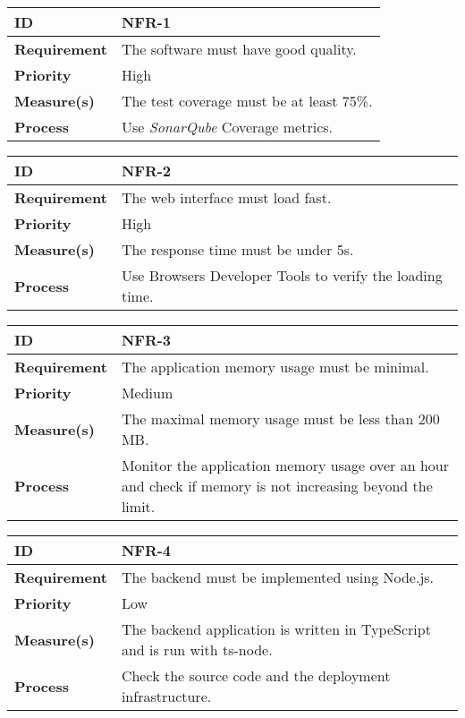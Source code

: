 \begin{center}
\begin{tabular}{ | m{8em} | m{25em}| } 
 \hline
 \textbf{ID} & NFR-1\\ 
 \hline
 \textbf{Requirement} & The software must have good quality. \\
 \hline
 \textbf{Priority} & High\\
 \hline
 \textbf{Measure(s)} & The test coverage must be at least 75\%.\\
 \hline
 \textbf{Process} & Use \textit{SonarQube} Coverage metrics. \\
 \hline
\end{tabular}
\end{center}

\begin{center}
\begin{tabular}{ | m{8em} | m{25em}| } 
 \hline
 \textbf{ID} & NFR-2\\ 
 \hline
 \textbf{Requirement} & The web interface must load fast.\\
 \hline
 \textbf{Priority} & High\\
 \hline
 \textbf{Measure(s)} & The response time must be under 5s.\\
 \hline
 \textbf{Process} & Use Browsers Developer Tools to verify the loading time.\\
 \hline
\end{tabular}
\end{center}

\begin{center}
\begin{tabular}{ | m{8em} | m{25em}| } 
 \hline
 \textbf{ID} & NFR-3\\ 
 \hline
 \textbf{Requirement} & The application memory usage must be minimal.\\
 \hline
 \textbf{Priority} & Medium\\
 \hline
 \textbf{Measure(s)} & The maximal memory usage must be less than 200 MB.\\
 \hline
 \textbf{Process} & Monitor the application memory usage over an hour and check if memory is not increasing beyond the limit.\\
 \hline
\end{tabular}
\end{center}

\begin{center}
\begin{tabular}{ | m{8em} | m{25em}| } 
 \hline
 \textbf{ID} & NFR-4\\ 
 \hline
 \textbf{Requirement} & The backend must be implemented using Node.js.\\
 \hline
 \textbf{Priority} & Low\\
 \hline
 \textbf{Measure(s)} & The backend application is written in TypeScript and is run with ts-node. \\
 \hline
 \textbf{Process} & Check the source code and the deployment infrastructure.\\
 \hline
\end{tabular}
\end{center}

